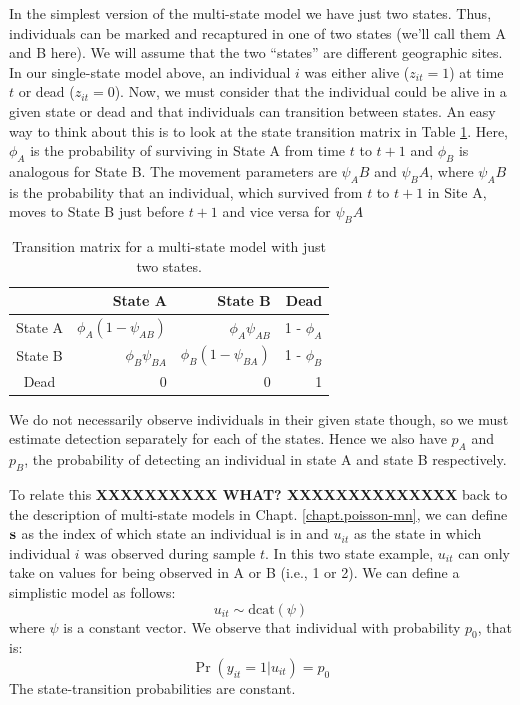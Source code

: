 In the simplest version of the multi-state model we have just two states.  Thus, individuals
can be marked and recaptured in one of two states (we'll call them A and B here).
We will assume that the two ``states'' are different
geographic sites.
In our single-state model above, an individual $i$ was either alive ($z_{it}=1$) at time $t$
or dead ($z_{it}=0$).  Now, we must consider that the individual could be alive in a given state or
dead and that individuals can transition between states.  An easy way to think about this is to look at
the state transition matrix in Table \ref{open.tab.CJSmulti-matrix}.
Here, $\phi_A$ %
is the probability of surviving
in State A from time $t$ to $t+1$ and $\phi_B$ is analogous for State B.  The
movement parameters are $\psi_AB$ and $\psi_BA$,
where $\psi_AB$ is the probability that an individual, which survived
from $t$ to $t+1$ in Site A, moves to State B just
before $t+1$ and vice versa for $\psi_BA$


\begin{table}[htb!]
\centering
\caption{
Transition matrix for a multi-state model with just two states.
}
\begin{tabular}{crrr}
\hline \hline
    &   State A &   State B   &   Dead \\  \hline
State A & $\phi_A(1-\psi_{AB})$ & $\phi_A \psi_{AB}$ & 1 - $\phi_A$ \\
State B & $\phi_B \psi_{BA}$ & $\phi_B(1-\psi_{BA})$ & 1 - $\phi_B$ \\
Dead & 0 & 0 & 1\\ \hline
\end{tabular}
\label{open.tab.CJSmulti-matrix}
\end{table}

We do not necessarily observe individuals in their given state though,
so we must estimate detection separately for each of the states.
Hence we also have $p_A$ and $p_B$, the probability of detecting an
individual in state A and state B respectively.

To relate this {\bf XXXXXXXXXX WHAT? XXXXXXXXXXXXXX}
back to the description of multi-state models in Chapt. \ref{chapt.poisson-mn}, we can define ${\bf s}$
as the index of which state an individual is in and $u_{it}$ as
the state in which individual $i$ was observed during sample $t$.  In this two state example,
$u_{it}$ can only take on values for being observed in A or B (i.e., 1 or 2).
We can define a simplistic model as follows:
\[
u_{it} \sim  \mathrm{dcat}(\psi)
\]
where $\psi$ is a constant vector.
We observe that individual with probability $p_{0}$, that is:
\[
 \Pr(y_{it} = 1| u_{it} )  = p_{0}
\]
The state-transition probabilities are constant.

